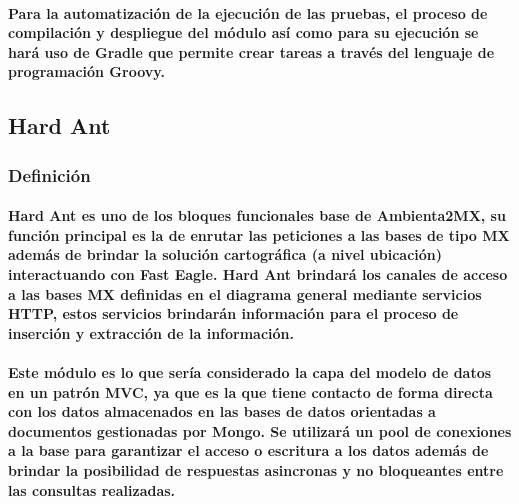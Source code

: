     \paragraph{Para la automatización de la ejecución de las pruebas, el proceso de compilación y despliegue del módulo así como para su ejecución se hará uso de Gradle que permite crear tareas a través del lenguaje de programación Groovy.}
  \subsection{Hard Ant}
    \subsubsection{Definición}
      \paragraph{Hard Ant es uno de los bloques funcionales base de Ambienta2MX, su función principal es la de enrutar las peticiones a las bases de tipo MX además de brindar la solución cartográfica (a nivel ubicación) interactuando con Fast Eagle. Hard Ant brindará los canales de acceso a las bases MX definidas en el diagrama general mediante servicios HTTP, estos servicios brindarán información para el proceso de inserción y extracción de la información. }
      \paragraph{Este módulo es lo que sería considerado la capa del modelo de datos en un patrón MVC, ya que es la que tiene contacto de forma directa con los datos almacenados en las bases de datos orientadas a documentos gestionadas por Mongo. Se utilizará un pool de conexiones a la base para garantizar el acceso o escritura a los datos además de brindar la posibilidad de respuestas asincronas y no bloqueantes entre las consultas realizadas.}
